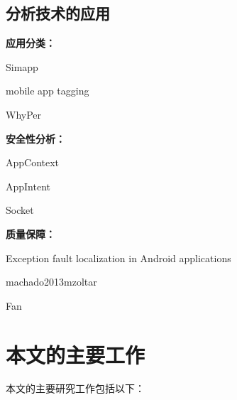 \subsection{分析技术的应用}
\textbf{应用分类：}

Simapp~\cite{chen2015simapp}

mobile app tagging ~\cite{chen2016mobile}

WhyPer~\cite{pandita2013whyper}


\textbf{安全性分析：}


AppContext~\cite{yang2015appcontext}

AppIntent~\cite{yang2013appintent}

Socket~\cite{bu2017program}


\textbf{质量保障：}


Exception fault localization in Android applications~\cite{mirzaei2015exception}

machado2013mzoltar~\cite{machado2013mzoltar}


Fan~\cite{fan2018efficiently,fan2018large}


\section{本文的主要工作}

本文的主要研究工作包括以下：

